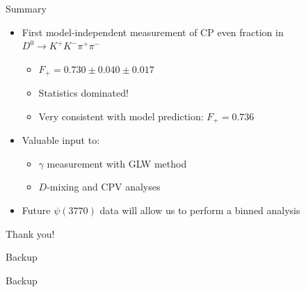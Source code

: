 \documentclass{beamer}
\begin{document}
\begin{frame}{Summary}
  \begin{itemize}
    \setlength\itemsep{1.0em}
    \item{First model-independent measurement of CP even fraction in $D^0\to K^+K^-\pi^+\pi^-$}
    \begin{itemize}
      \item{$F_+ = 0.730 \pm 0.040 \pm 0.017$}
      \item{Statistics dominated!}
      \item{Very consistent with model prediction: $F_+ = 0.736$}
    \end{itemize}
    \item{Valuable input to:}
    \begin{itemize}
      \item{$\gamma$ measurement with GLW method}
      \item{$D$-mixing and CPV analyses}
    \end{itemize}
    \item{Future $\psi(3770)$ data will allow us to perform a binned analysis}
  \end{itemize}
  \vspace{0.4cm}
  \begin{center}
    {\huge Thank you!}
  \end{center}
\end{frame}

\begin{frame}{Backup}
  \begin{center}
    {\huge Backup}
  \end{center}
\end{frame}
\end{document}
